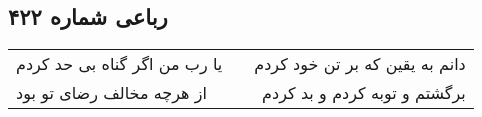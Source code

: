 \begin{center}
\section*{رباعی شماره ۴۲۲}
\label{sec:sh422}
\begin{longtable}{l p{0.5cm} r}
یا رب من اگر گناه بی حد کردم
&&
دانم به یقین که بر تن خود کردم
\\
از هرچه مخالف رضای تو بود
&&
برگشتم و توبه کردم و بد کردم
\\
\end{longtable}
\end{center}
